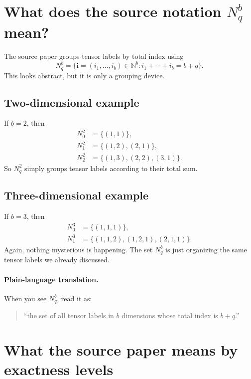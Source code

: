\documentclass[11pt]{article}
\begin{document}
\section{What does the source notation \texorpdfstring{\(N_q^b\)}{Nqb} mean?}
\label{sec:Nqb}

The source paper groups tensor labels by total index using
\begin{equation}
  N_q^b
  =
  \{\mathbf i=(i_1,\ldots,i_b)\in\mathbb N^b: i_1+\cdots+i_b=b+q\}.
  \label{eq:Nqb-definition}
\end{equation}
This looks abstract, but it is only a grouping device.

\subsection{Two-dimensional example}

If \(b=2\), then
\begin{align}
  N_0^2 &= \{(1,1)\},\\
  N_1^2 &= \{(1,2),(2,1)\},\\
  N_2^2 &= \{(1,3),(2,2),(3,1)\}.
\end{align}
So \(N_q^2\) simply groups tensor labels according to their total sum.

\subsection{Three-dimensional example}

If \(b=3\), then
\begin{align}
  N_0^3 &= \{(1,1,1)\},\\
  N_1^3 &= \{(1,1,2),(1,2,1),(2,1,1)\}.
\end{align}
Again, nothing mysterious is happening.  The set \(N_q^b\) is just organizing the
same tensor labels we already discussed.

\paragraph{Plain-language translation.}
When you see \(N_q^b\), read it as:
\begin{quote}
``the set of all tensor labels in \(b\) dimensions whose total index is
\(b+q\).''
\end{quote}

\section{What the source paper means by exactness levels}
\label{sec:exactness-levels}
\end{document}
